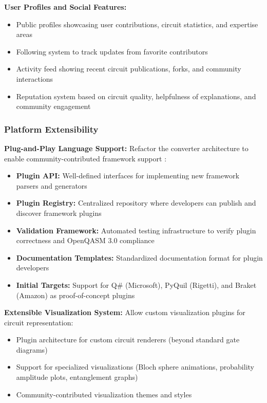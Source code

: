 \textbf{User Profiles and Social Features:}
\begin{itemize}
    \item Public profiles showcasing user contributions, circuit statistics, and expertise areas
    \item Following system to track updates from favorite contributors
    \item Activity feed showing recent circuit publications, forks, and community interactions
    \item Reputation system based on circuit quality, helpfulness of explanations, and community engagement
\end{itemize}

\subsubsection{Platform Extensibility}

\textbf{Plug-and-Play Language Support:} Refactor the converter architecture to enable community-contributed framework support \cite{sivarajah2020tket, mccaskey2020xacc}:
\begin{itemize}
    \item \textbf{Plugin API:} Well-defined interfaces for implementing new framework parsers and generators
    \item \textbf{Plugin Registry:} Centralized repository where developers can publish and discover framework plugins
    \item \textbf{Validation Framework:} Automated testing infrastructure to verify plugin correctness and OpenQASM 3.0 compliance
    \item \textbf{Documentation Templates:} Standardized documentation format for plugin developers
    \item \textbf{Initial Targets:} Support for Q\# (Microsoft), PyQuil (Rigetti), and Braket (Amazon) as proof-of-concept plugins
\end{itemize}

\textbf{Extensible Visualization System:} Allow custom visualization plugins for circuit representation:
\begin{itemize}
    \item Plugin architecture for custom circuit renderers (beyond standard gate diagrams)
    \item Support for specialized visualizations (Bloch sphere animations, probability amplitude plots, entanglement graphs)
    \item Community-contributed visualization themes and styles
\end{itemize}

